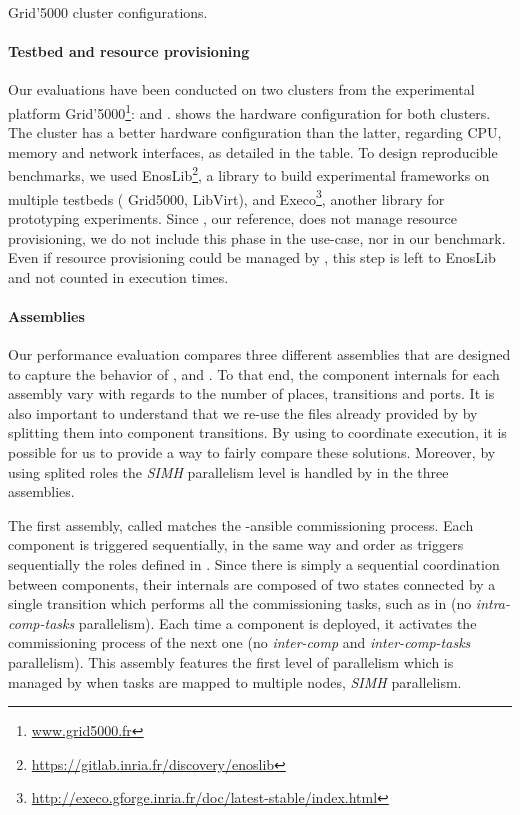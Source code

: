 \begin{table}
  \begin{center}
    \small
    
    \caption{Grid'5000 cluster configurations.}
    \label{tab:g5k}
  \end{center}
\end{table}

\paragraph{Testbed and resource provisioning}
Our evaluations have been conducted on two clusters from the
experimental platform Grid'5000\footnote{\url{www.grid5000.fr}}:
\ecotype and \nova.  shows the hardware configuration
for both clusters. The cluster \ecotype has a better hardware
configuration than the latter, regarding CPU, memory and network
interfaces, as detailed in the table. To design reproducible
benchmarks, we used
EnosLib\footnote{\url{https://gitlab.inria.fr/discovery/enoslib}}, a
library to build experimental frameworks on multiple testbeds (\eg
Grid5000, LibVirt), and
Execo\footnote{\url{http://execo.gforge.inria.fr/doc/latest-stable/index.html}},
another library for prototyping experiments. Since \kolla, our
reference, does not manage resource provisioning, we do not include
this phase in the use-case, nor in our benchmark. Even if resource
provisioning could be managed by \mad, this step is left to EnosLib
and not counted in execution times.

\paragraph{Assemblies}
Our performance evaluation compares three different assemblies that
are designed to capture the behavior of \ansible, \aeolus and \mad. To
that end, the component internals for each assembly vary with regards
to the number of places, transitions and ports. It is also important
to understand that we re-use the \ansible files already provided by
\kolla by splitting them into component transitions. By using \mad to
coordinate \ansible execution, it is possible for us to provide a way
to fairly compare these solutions. Moreover, by using splited \kolla
roles the \emph{SIMH} parallelism level is handled by \ansible in the
three assemblies.

The first assembly, called \ansass matches the \kolla-ansible
commissioning process. Each component is triggered sequentially, in
the same way and order as \ansible triggers sequentially the roles
defined in \kolla. Since there is simply a sequential coordination
between components, their internals are composed of two states
connected by a single transition which performs all the commissioning
tasks, such as in \kolla (\ie no \emph{intra-comp-tasks}
parallelism). Each time a component is deployed, it activates the
commissioning process of the next one (\ie no \emph{inter-comp} and
\emph{inter-comp-tasks} parallelism). This assembly features the first
level of parallelism which is managed by \ansible when tasks are
mapped to multiple nodes, \ie \emph{SIMH} parallelism.
%


